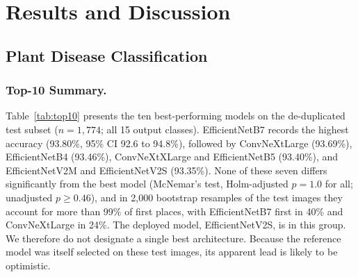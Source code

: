 \section{Results and Discussion}
\label{sec:results}

\subsection{Plant Disease Classification}

\subsubsection{Top-10 Summary.}
Table~\ref{tab:top10} presents the ten best-performing models on the de-duplicated test subset ($n=1{,}774$; all 15 output classes). EfficientNetB7 records the highest accuracy (93.80\%, 95\% CI 92.6 to 94.8\%), followed by ConvNeXtLarge (93.69\%), EfficientNetB4 (93.46\%), ConvNeXtXLarge and EfficientNetB5 (93.40\%), and EfficientNetV2M and EfficientNetV2S (93.35\%). None of these seven differs significantly from the best model (McNemar's test, Holm-adjusted $p=1.0$ for all; unadjusted $p\ge0.46$), and in 2{,}000 bootstrap resamples of the test images they account for more than 99\% of first places, with EfficientNetB7 first in 40\% and ConvNeXtLarge in 24\%. The deployed model, EfficientNetV2S, is in this group. We therefore do not designate a single best architecture. Because the reference model was itself selected on these test images, its apparent lead is likely to be optimistic.


